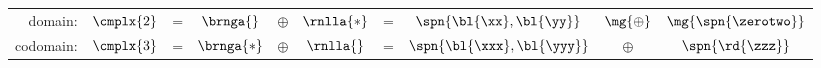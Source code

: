 \begin{table}[h!]
	\begin{center}
		\begin{tabular}{rccccccccc}
		  domain: & $\cmplx{2}$ & = & $\brnga{}$ & $\oplus$ & $\rnlla{*}$ & = & $\spn{\bl{\xx},\bl{\yy}}$ & $\mg{\oplus}$ & $\mg{\spn{\zerotwo}}$ \\[12pt]
		  codomain: & $\cmplx{3}$ & = & $\brnga{*}$ & $\oplus$ & $\rnlla{}$ & = & $\spn{\bl{\xxx},\bl{\yyy}}$ & $\oplus$ & $\spn{\rd{\zzz}}$
		\end{tabular}
	\end{center}
\end{table}%

\endinput  %